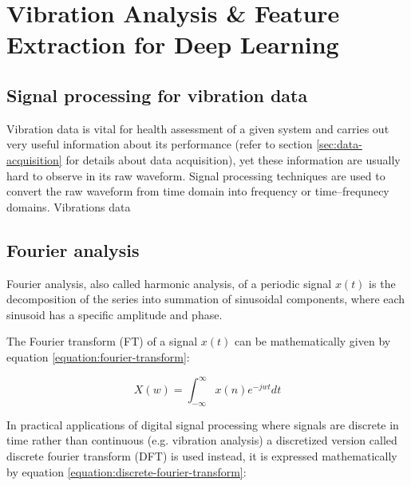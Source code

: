 \chapter{Vibration Analysis \& Feature Extraction for Deep Learning}


\section{Signal processing for vibration data}
Vibration data is vital for health assessment of a given system and carries out very useful information about its performance (refer to section \ref{sec:data-acquisition} for details about data acquisition), yet these information are usually hard to observe in its raw waveform. Signal processing techniques are used to convert the raw waveform from time domain into frequency or time–frequnecy domains.
Vibrations data 

\section{Fourier analysis}
Fourier analysis, also called harmonic analysis, of a periodic signal $x(t)$ is the decomposition of the series into summation of sinusoidal components, where each sinusoid has a specific amplitude and phase.

The Fourier transform (FT) of a signal $x(t)$ can be mathematically given by equation \ref{equation:fourier-transform}:

\begin{equation}
    X(w) = \int_{-\infty}^{\infty}x(n)e^{-jwt}dt
    \label{equation:fourier-transform}
\end{equation}

In practical applications of digital signal processing where signals are discrete in time rather than continuous (e.g. vibration analysis) a discretized version called discrete fourier transform (DFT) is used instead, it is expressed mathematically by equation \ref{equation:discrete-fourier-transform}:

